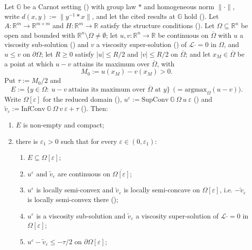 \begin{theorem}
Let $\mathbb G$ be a Carnot setting () with group law $*$ and
homogeneous norm $\|\cdot\|$, write $d(x,y):=\|y^{-1}*x\|$, and let the cited results at $\mathbb G$ hold
(). Let $A:\mathbb R^{m}\to\mathbb R^{m\times m}$ and
$H:\mathbb R^{m}\to\mathbb R$ satisfy the structure conditions
(). Let $\Omega\subseteq\mathbb R^{n}$ be open and bounded
with $\mathbb R^{n}\setminus\Omega\neq\emptyset$; let $u,v:\mathbb R^{n}\to\mathbb R$ be
continuous on $\overline\Omega$ with $u$ a viscosity sub-solution ()
and $v$ a viscosity super-solution () of $\mathcal L\cdot=0$ in
$\Omega$, and $u\le v$ on $\partial\Omega$; let $R\ge0$ satisfy $|u|\le R/2$ and
$|v|\le R/2$ on $\overline\Omega$; and let $x_M\in\overline\Omega$ be a point at which
$u-v$ attains its maximum over $\overline\Omega$, with
\[
 M_0:=u(x_M)-v(x_M)>0 .
\]
Put $\tau:=M_0/2$ and
\[
 E:=\big\{y\in\Omega:\ u-v\ \text{attains its maximum over }\overline\Omega\text{ at }y\big\}
 \ \ \big(=\mathrm{argmax}_\Omega(u-v)\big).
\]
Write $\Omega[\varepsilon]$ for the reduced domain (),
$u^{\varepsilon}:=\mathrm{SupConv}\ \mathbb G\ \Omega\ u\ \varepsilon$ ()
and $\tilde v_{\varepsilon}:=\mathrm{InfConv}\ \mathbb G\ \Omega\ v\ \varepsilon+\tau$
(). Then:
\begin{enumerate}
\item $E$ is non-empty and compact;
\item there is $\varepsilon_1>0$ such that for every $\varepsilon\in(0,\varepsilon_1)$:
  \begin{enumerate}
  \item $E\subseteq\Omega[\varepsilon]$;
  \item $u^{\varepsilon}$ and $\tilde v_{\varepsilon}$ are continuous on
    $\overline{\Omega[\varepsilon]}$;
  \item $u^{\varepsilon}$ is locally semi-convex and $\tilde v_{\varepsilon}$ is locally
    semi-concave on $\Omega[\varepsilon]$, i.e. $-\tilde v_{\varepsilon}$ is locally
    semi-convex there ();
  \item $u^{\varepsilon}$ is a viscosity sub-solution and $\tilde v_{\varepsilon}$ a
    viscosity super-solution of $\mathcal L\cdot=0$ in $\Omega[\varepsilon]$;
  \item $u^{\varepsilon}-\tilde v_{\varepsilon}\le-\tau/2$ on $\partial\Omega[\varepsilon]$;

\end{enumerate}
\end{enumerate}
\end{theorem}
